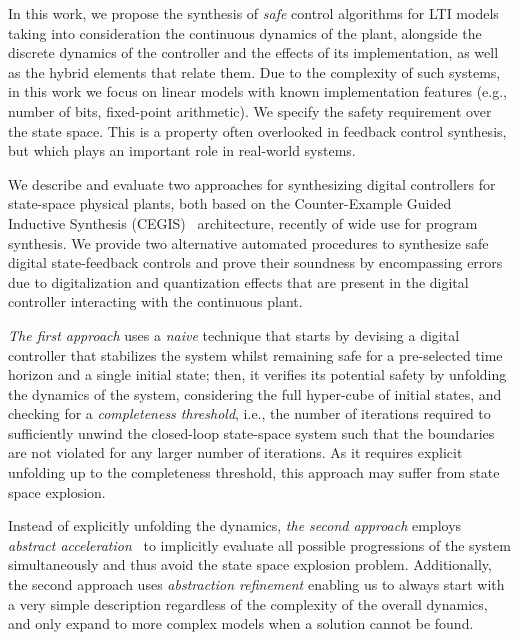 \documentclass[runningheads,a4paper]{llncs}
\begin{document}
In this work, we propose the synthesis of \emph{safe} control algorithms for
LTI models taking into consideration the continuous dynamics of the plant, 
alongside the discrete dynamics of the controller and the effects of its 
implementation, as well as the hybrid elements that relate them.  
Due to the complexity of such systems, in this work we focus 
on linear models with known  implementation features (e.g., number of bits, fixed-point
arithmetic). We specify the safety requirement over the state space. This is a property often 
overlooked in feedback control synthesis, but which plays an important role 
in real-world systems.

We describe and evaluate two approaches for synthesizing digital controllers for state-space physical plants, 
both based on the Counter-Example Guided Inductive Synthesis (CEGIS)~\cite{sketch} architecture, recently of wide use for program synthesis.   
We provide two alternative automated procedures to synthesize safe 
digital state-feedback controls
and prove their soundness by encompassing errors due to digitalization and quantization effects that are present in the digital controller interacting with the continuous plant. 

{\em The first approach} uses a {\em naive}
technique that starts by devising a digital controller that stabilizes the system
whilst remaining safe for a 
pre-selected time horizon and a single initial state; then, it verifies its potential safety by unfolding
the dynamics of the system, considering the full hyper-cube of initial states, and checking for a {\em completeness threshold}, i.e.,
the number of iterations required to sufficiently unwind
the closed-loop state-space system such
that the boundaries are not violated for any larger number of iterations.
As it requires explicit unfolding up to the completeness
threshold, this approach may suffer from state space explosion.

Instead of explicitly unfolding the dynamics, {\em the second approach} 
employs {\em abstract acceleration}~\cite{cattaruzza2015unbounded} to implicitly
evaluate all possible progressions of the system simultaneously and thus avoid
the state space explosion problem.
Additionally, the second approach uses
{\em abstraction refinement} enabling us to always start with a very simple description
regardless of the complexity of the overall dynamics, and only expand to more
complex models when a solution cannot be found.
\end{document}
